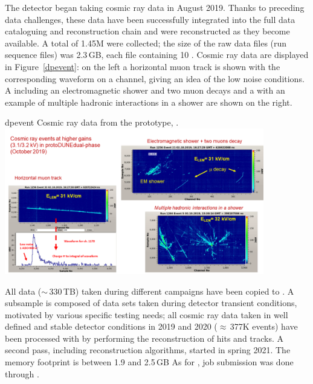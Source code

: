 \documentclass[../main-v1.tex]{subfiles}
\begin{document}
The  detector began taking cosmic ray data in August 2019. Thanks to preceding data challenges, these data have been successfully integrated into the full data cataloguing and reconstruction chain and were   reconstructed as they become available.
A total of 1.45M  were collected; the size of the raw data files (run sequence files) was 2.3\,GB, each file containing 10 . Cosmic ray data are displayed in Figure~\ref{dpevent}: on
the left a horizontal muon track is shown with the corresponding waveform on a channel, giving an
idea of the low noise conditions. A  including an electromagnetic shower and two muon decays
and a  with an example of multiple hadronic interactions in a shower are shown on the right.


 
\begin{dunefigure}
{dpevent} %
{Cosmic ray data from the  prototype, .}
\includegraphics[width=0.85\textwidth]{graphics/IntroFigures/Fig_09_protodune-dp-event.png}
\end{dunefigure}


All data ($\sim$\,330\,TB) taken during different campaigns   have been copied to . A subsample is composed of data sets taken during detector transient conditions, motivated by various specific testing needs;  all cosmic ray data taken in well defined and stable detector conditions in 2019 and 2020 ($\approx$\,377K events) have been processed with  by performing the reconstruction of hits and \twod tracks. A second pass, including  reconstruction algorithms, started in spring 2021. 
The memory footprint is between 1.9 and 2.5\,GB
As for , job submission was done through .
\end{document}
